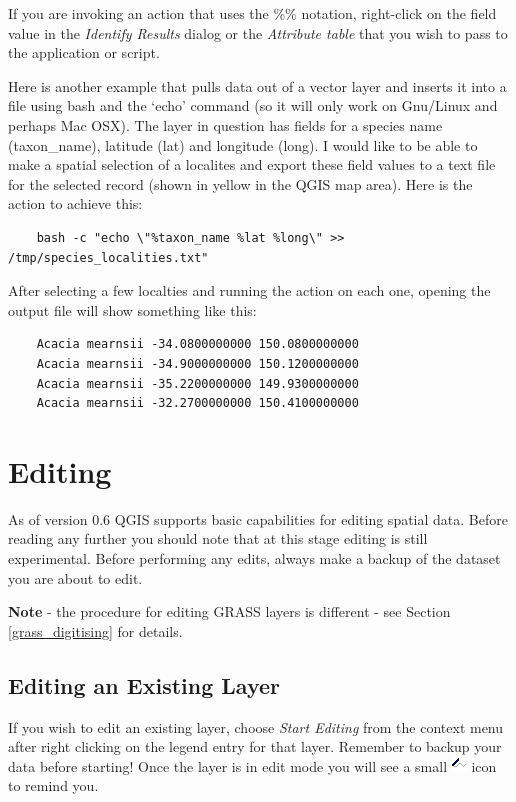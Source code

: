 If you are invoking an action that uses the \%\% notation, right-click on the
field value in the \textit{Identify Results} dialog or the
\textit{Attribute table} that you wish to pass to the application or script.

Here is another example that pulls data out of a vector layer and inserts it
into a file using bash and the `echo' command (so it will only work on Gnu/Linux
and perhaps Mac OSX). The layer in question has fields for a species name
(taxon\_name), latitude (lat) and longitude (long). I would like to be able to
make a spatial selection of a localites and export these field values to a text
file for the selected record (shown in yellow in the QGIS map area). Here is the
action to achieve this:

\begin{verbatim}
	bash -c "echo \"%taxon_name %lat %long\" >> /tmp/species_localities.txt"
\end{verbatim} 

After selecting a few localties and running the action on each one, opening the output file will show something like this:

\begin{verbatim}
	Acacia mearnsii -34.0800000000 150.0800000000
	Acacia mearnsii -34.9000000000 150.1200000000
	Acacia mearnsii -35.2200000000 149.9300000000
	Acacia mearnsii -32.2700000000 150.4100000000
\end{verbatim} 


\section{Editing}

As of version 0.6 QGIS supports basic capabilities for editing spatial data.
Before reading any further you should note that at this stage editing is still
experimental. Before performing any edits, always make a backup of the dataset
you are about to edit. 

\textbf{Note} - the procedure for editing GRASS layers is different - see
Section \ref{grass_digitising} for details.

\subsection{Editing an Existing Layer}
\label{sec:edit_existing_layer}
If you wish to edit an existing layer, choose \textit{Start Editing} from the
context menu after right clicking on the legend entry for that layer. Remember
to backup your data before starting! Once the layer is in edit mode you will
see a small \includegraphics[scale=1]{qgis_user_guide_images/editable} icon to
remind you.

